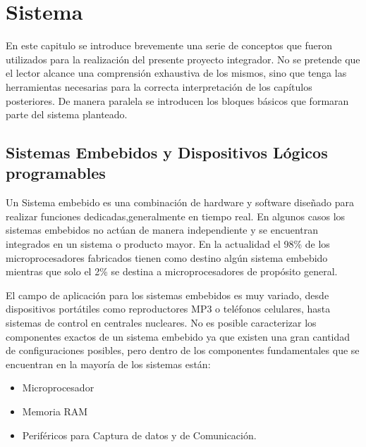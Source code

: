 \chapter{Sistema}
En este capitulo se introduce brevemente una serie de conceptos que fueron utilizados para la realización del presente proyecto integrador. No se pretende que el lector alcance una comprensión exhaustiva de los mismos, sino que tenga las herramientas necesarias para la correcta interpretación de los capítulos posteriores. De manera paralela se introducen los bloques básicos que formaran parte del sistema planteado.

\section{Sistemas Embebidos y Dispositivos Lógicos programables}

Un Sistema embebido es una combinación de hardware y software diseñado para realizar funciones dedicadas,generalmente en tiempo real. En algunos casos los sistemas embebidos no actúan de manera independiente y se encuentran integrados en un sistema o producto mayor.
En la actualidad el 98\% de los microprocesadores fabricados tienen como destino algún sistema embebido mientras que solo el 2\% se destina a microprocesadores de propósito general.

El campo de aplicación para los sistemas embebidos es muy variado, desde dispositivos portátiles como reproductores MP3 o teléfonos celulares, hasta sistemas de control en centrales nucleares.
No es posible caracterizar los componentes exactos de un sistema embebido ya que existen una gran cantidad de configuraciones posibles, pero dentro de los componentes fundamentales que se encuentran en la mayoría de los sistemas están:

\begin{itemize}
\item Microprocesador
\item Memoria RAM 
\item Periféricos para Captura de datos y de Comunicación.
\end{itemize}

